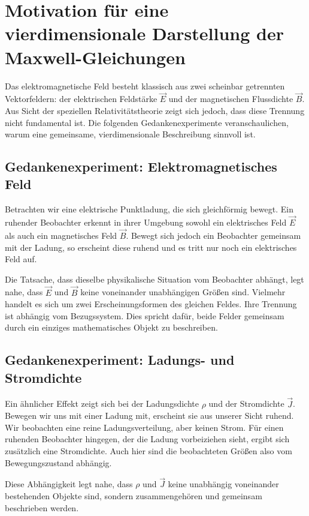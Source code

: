 \section{Motivation für eine vierdimensionale Darstellung der Maxwell-Gleichungen}
\label{maxwell:motivation}

Das elektromagnetische Feld besteht klassisch aus zwei scheinbar getrennten Vektorfeldern: der elektrischen Feldstärke \( \vec{E} \) und der magnetischen Flussdichte \( \vec{B} \). Aus Sicht der speziellen Relativitätstheorie zeigt sich jedoch, dass diese Trennung nicht fundamental ist. Die folgenden Gedankenexperimente veranschaulichen, warum eine gemeinsame, vierdimensionale Beschreibung sinnvoll ist.

\subsection{Gedankenexperiment: Elektromagnetisches Feld}

Betrachten wir eine elektrische Punktladung, die sich gleichförmig bewegt.
Ein ruhender Beobachter erkennt in ihrer Umgebung sowohl ein elektrisches Feld \( \vec{E} \) als auch ein magnetisches Feld \( \vec{B} \).
Bewegt sich jedoch ein Beobachter gemeinsam mit der Ladung, so erscheint diese ruhend und es tritt nur noch ein elektrisches Feld auf. 

Die Tatsache, dass dieselbe physikalische Situation vom Beobachter abhängt, legt nahe, dass \( \vec{E} \) und \( \vec{B} \) keine voneinander unabhängigen Größen sind.
Vielmehr handelt es sich um zwei Erscheinungsformen des gleichen Feldes.
Ihre Trennung ist abhängig vom Bezugssystem.
Dies spricht dafür, beide Felder gemeinsam durch ein einziges mathematisches Objekt zu beschreiben.

\subsection{Gedankenexperiment: Ladungs- und Stromdichte}

Ein ähnlicher Effekt zeigt sich bei der Ladungsdichte \( \rho \) und der Stromdichte \( \vec{J} \).
Bewegen wir uns mit einer Ladung mit, erscheint sie aus unserer Sicht ruhend.
Wir beobachten eine reine Ladungsverteilung, aber keinen Strom.
Für einen ruhenden Beobachter hingegen, der die Ladung vorbeiziehen sieht, ergibt sich zusätzlich eine Stromdichte.
Auch hier sind die beobachteten Größen also vom Bewegungszustand abhängig.

Diese Abhängigkeit legt nahe, dass \( \rho \) und \( \vec{J} \) keine unabhängig voneinander bestehenden Objekte sind, sondern zusammengehören und gemeinsam beschrieben werden.

